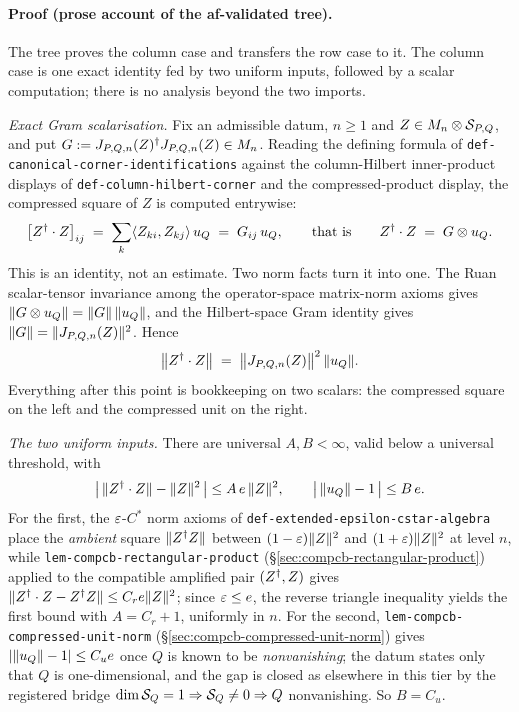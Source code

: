 \paragraph{Proof (prose account of the af-validated tree).}
The tree proves the column case and transfers the row case to it. The column case is one
exact identity fed by two uniform inputs, followed by a scalar computation; there is no
analysis beyond the two imports.

\emph{Exact Gram scalarisation.} Fix an admissible datum, $n\ge1$ and
$Z\in M_{n}\otimes \mathcal S_{P,Q}$, and put $G:=J_{P,Q,n}(Z)^{\dagger} J_{P,Q,n}(Z)\in M_{n}$. Reading
the defining formula of \texttt{def-canonical-corner-identifications} against the
column-Hilbert inner-product displays of \texttt{def-column-hilbert-corner} and the
compressed-product display, the compressed square of $Z$ is computed entrywise:
\begin{equation}\label{eq:cg-entry}
  \bigl[Z^{\dagger}\mathbin{\cdot} Z\bigr]_{ij}
  \;=\;\sum_k\langle Z_{ki},Z_{kj}\rangle\,u_{Q}
  \;=\;G_{ij}\,u_{Q},
  \qquad\text{that is}\qquad
  Z^{\dagger}\mathbin{\cdot} Z\;=\;G\otimes u_{Q}.
\end{equation}
This is an identity, not an estimate. Two norm facts turn it into one. The Ruan
scalar-tensor invariance among the operator-space matrix-norm axioms gives
$\lVert G\otimes u_{Q}\rVert=\lVert G\rVert\,\lVert u_{Q}\rVert$, and the Hilbert-space Gram identity
gives $\lVert G\rVert=\lVert J_{P,Q,n}(Z)\rVert^{2}$. Hence
\begin{equation}\label{eq:cg-scalar}
  \bigl\lVert Z^{\dagger}\mathbin{\cdot} Z\bigr\rVert
  \;=\;\bigl\lVert J_{P,Q,n}(Z)\bigr\rVert^{2}\,\lVert u_{Q}\rVert .
\end{equation}
Everything after this point is bookkeeping on two scalars: the compressed square on the
left and the compressed unit on the right.

\emph{The two uniform inputs.} There are universal $A,B<\infty$, valid below a universal
threshold, with
\begin{equation}\label{eq:cg-inputs}
  \bigl\lvert\,\lVert Z^{\dagger}\mathbin{\cdot} Z\rVert-\lVert Z\rVert^{2}\,\bigr\rvert\le A\,e\,\lVert Z\rVert^{2},
  \qquad
  \bigl\lvert\,\lVert u_{Q}\rVert-1\,\bigr\rvert\le B\,e .
\end{equation}
For the first, the $\varepsilon$-$C^*$ norm axioms of \texttt{def-extended-epsilon-cstar-algebra}
place the \emph{ambient} square $\lVert Z^{\dagger} Z\rVert$ between $(1-\varepsilon)\lVert Z\rVert^{2}$ and
$(1+\varepsilon)\lVert Z\rVert^{2}$ at level $n$, while
\texttt{lem-compcb-rectangular-product} (\S\ref{sec:compcb-rectangular-product}) applied to
the compatible amplified pair $(Z^{\dagger},Z)$ gives
$\lVert Z^{\dagger}\mathbin{\cdot} Z-Z^{\dagger} Z\rVert\le C_re\lVert Z\rVert^{2}$; since $\varepsilon\le e$, the reverse
triangle inequality yields the first bound with $A=C_r+1$, uniformly in $n$. For the
second, \texttt{lem-compcb-compressed-unit-norm}
(\S\ref{sec:compcb-compressed-unit-norm}) gives $\lvert\lVert u_{Q}\rVert-1\rvert\le
C_ue$ once $Q$ is known to be \emph{nonvanishing}; the datum states only that $Q$ is
one-dimensional, and the gap is closed as elsewhere in this tier by the registered bridge
$\dim\mathcal S_{Q}=1\Rightarrow\mathcal S_{Q}\ne0\Rightarrow Q$ nonvanishing. So $B=C_u$.

